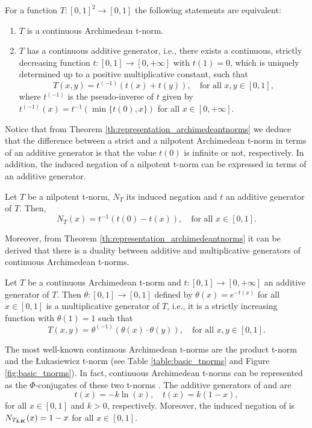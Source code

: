 \begin{theorem}\label{th:representation_archimedeantnorms}
	For a function $T:[0,1]^2 \to [0,1]$ the following statements are equivalent:
	\begin{enumerate}[label=(\roman*)]
		\item $T$ is a continuous Archimedean t-norm.
		\item $T$ has a continuous additive generator, i.e., there exists a continuous, strictly decreasing function $t:[0,1]\to [0,+\infty]$ with $t(1)=0$, which is uniquely determined up to a positive multiplicative constant, such that
		$$ T(x,y)=t^{(-1)}(t(x)+t(y)), \quad \text{for all } x,y \in [0,1],$$
		where $t^{(-1)}$ is the pseudo-inverse of $t$ given by $t^{(-1)}(x)=t^{-1}(\min\{t(0),x\})$ for all $x \in [0,+\infty]$.
	\end{enumerate}
\end{theorem}

Notice that from Theorem \ref{th:representation_archimedeantnorms} we deduce that the difference between a strict and a nilpotent Archimedean t-norm in terms of an additive generator is that the value $t(0)$ is infinite or not, respectively. In addition, the induced negation of a nilpotent t-norm can be expressed in terms of an additive generator.

\begin{remark}\label{remark:gen_negation}
	Let $T$ be a nilpotent t-norm, $N_T$ its induced negation and $t$ an additive generator of $T$. Then,
	$$N_T(x)=t^{-1}(t(0)-t(x)), \quad \text{for all } x \in [0,1].$$
\end{remark}

Moreover, from Theorem \ref{th:representation_archimedeantnorms} it can be derived that there is a duality between additive and multiplicative generators of continuous Archimedean t-norms.

\begin{remark}
	Let $T$ be a continuous Archimedean t-norm and $t: [0,1] \to [0,+\infty]$ an additive generator of $T$. Then $\theta:[0,1] \to [0,1]$ defined by $\theta(x)=e^{-t(x)}$ for all $x \in [0,1]$ is a multiplicative generator of $T$, i.e., it is a strictly increasing function with $\theta(1)=1$ such that
	$$T(x,y)=\theta^{(-1)}(\theta(x)\cdot\theta(y)), \quad \text{for all } x,y \in [0,1].$$
\end{remark}

\begin{example}\label{ex:Lukasiewicz} The most well-known continuous Archimedean t-norms are the product t-norm \TP and the Łukasiewicz t-norm \TLK (see Table \ref{table:basic_tnorms} and Figure \ref{fig:basic_tnorms}). In fact, continuous Archimedean t-norms can be represented as the $\Phi$-conjugates of these two t-norms \cite[Propositions 5.9 and 5.10]{Klement2000}. The additive generators of \TP and \TLK are
$$t(x)=-k\ln(x), \quad t(x)=k(1-x),$$
for all $x \in [0,1]$ and $k>0$, respectively. Moreover, the induced negation of \TLK is $N_{T_{\bm{LK}}}(x)=1-x$ for all $x \in [0,1]$.
\end{example}

